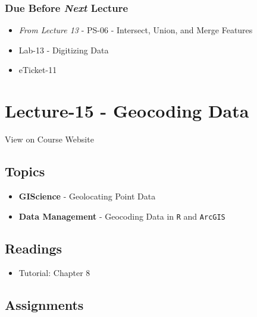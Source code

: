 \documentclass[]{book}
\providecommand{\tightlist}{%
  \setlength{\itemsep}{0pt}\setlength{\parskip}{0pt}}
\begin{document}
\hypertarget{due-before-next-lecture-12}{%
\subsubsection*{\texorpdfstring{Due Before \emph{Next} Lecture}{Due Before Next Lecture}}\label{due-before-next-lecture-12}}

\begin{itemize}
\tightlist
\item
  \emph{From Lecture 13} - PS-06 - Intersect, Union, and Merge Features
\item
  Lab-13 - Digitizing Data
\item
  eTicket-11
\end{itemize}

\hypertarget{lecture-15---geocoding-data}{%
\section*{Lecture-15 - Geocoding Data}\label{lecture-15---geocoding-data}}

View on Course Website

\hypertarget{topics-15}{%
\subsection*{Topics}\label{topics-15}}

\begin{itemize}
\tightlist
\item
  \textbf{GIScience} - Geolocating Point Data
\item
  \textbf{Data Management} - Geocoding Data in \texttt{R} and \texttt{ArcGIS}
\end{itemize}

\hypertarget{readings-15}{%
\subsection*{Readings}\label{readings-15}}

\begin{itemize}
\tightlist
\item
  Tutorial: Chapter 8
\end{itemize}

\hypertarget{assignments-16}{%
\subsection*{Assignments}\label{assignments-16}}
\end{document}

